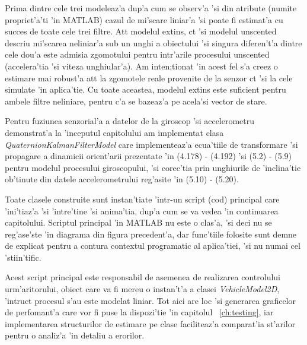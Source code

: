 \documentclass[12pt,a4paper,twoside]{report}
\begin{document}
\vspace{5px}

Prima dintre cele trei modeleaz'a dup'a cum se observ'a 'si din atribute (numite propriet'a'ti 'in MATLAB) cazul de mi'scare liniar'a 'si poate fi estimat'a cu succes de toate cele trei filtre. At\ia t modelul extins, c\ia t 'si modelul unscented descriu mi'scarea neliniar'a sub un unghi a obiectului 'si singura diferen't'a dintre cele dou'a este admisia zgomotului pentru intr'arile procesului unscented (accelera'tia 'si viteza unghiular'a). Am inten;tionat 'in acest fel s'a creez o estimare mai robust'a at\ia t la zgomotele reale provenite de la senzor c\ia t 'si la cele simulate 'in aplica'tie. Cu toate aceastea, modelul extins este suficient pentru ambele filtre neliniare, pentru c'a se bazeaz'a pe acela'si vector de stare. 

\vspace{5px}

Pentru fuziunea senzorial'a a datelor de la giroscop 'si accelerometru demonstrat'a la 'inceputul capitolului am implementat clasa \textit{QuaternionKalmanFilterModel} care implementeaz'a ecua'tiile de transformare 'si propagare a dinamicii orient'arii prezentate 'in (4.178) - (4.192) 'si (5.2) - (5.9) pentru modelul procesului giroscopului, 'si corec'tia prin unghiurile de 'inclina'tie ob'tinute din datele accelerometrului reg'asite 'in (5.10) - (5.20). 

\vspace{5px}

Toate clasele construite sunt instan'tiate 'intr-un script (cod) principal care 'ini'tiaz'a 'si 'intre'tine 'si anima'tia, dup'a cum se va vedea 'in continuarea capitolului. Scriptul principal 'in MATLAB nu este o clas'a, 'si deci nu se reg'ase'ste 'in diagrama din figura precedent'a, dar func'tiile folosite sunt demne de explicat pentru a contura contextul programatic al aplica'tiei, 'si nu numai cel 'stiin'tific.

\vspace{5px}

Acest script principal este responsabil de asemenea de realizarea controlului urm'aritorului, obiect care va fi mereu o instan't'a a clasei \textit{VehicleModel2D}, 'intruc\ia t procesul s'au este modelat liniar. Tot aici are loc 'si generarea graficelor de perfomant'a care vor fi puse la dispozi'tie 'in capitolul ~\ref{ch:testing}, iar implementarea structurilor de estimare pe clase faciliteaz'a comparat'ia st'arilor pentru o analiz'a 'in detaliu a erorilor. 
\end{document}
